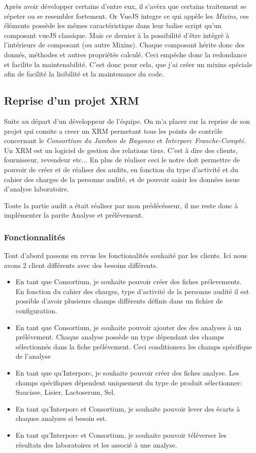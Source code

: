 Après avoir développer certains d'entre eux, il s'avèra que certains traitement se répeter ou se resembler fortement. Or VueJS integre ce qui appèle les \textit{Mixins}, ces éléments possède les mêmes caractéristique dans leur balise script qu'un composant vueJS classique. Mais ce dernier à la possibilité d'être intégré à l'intérieurs de composant (ou autre Mixins). Chaque composant hérite donc des donnés, méthodes et autres propriétés calculé. Ceci empêche donc la redondance et facilite la maintenabilité.
C'est donc pour cela, que j'ai créer un mixins spéciale afin de facilité la lisibilité et la maintenance du code. 


\subsection{Reprise d'un projet XRM}
Suite au départ d'un développeur de l'équipe. On m'a placer sur la reprise de son projet qui consite a creer un XRM permetant tous les points de contrôle concernant le \textit{Consortium du Jambon de Bayonne} et \textit{Interporc Franche-Compté}.
Un XRM est un logiciel de gestion des relations tiers. C'est à dire des clients, fournisseur, revendeur etc... En plus de réaliser ceci le notre doit permettre de pouvoir de créer et de réaliser des audits, en fonction du type d'activité et du cahier des charges de la personne audité, et de pouvoir saisir les données issue d'analyse laboratoire.

Toute la partie audit a était réaliser par mon prédécésseur, il me reste donc à implémenter la parite Analyse et prélévement. 

\subsubsection{Fonctionnalités}
Tout d'abord passons en revus les fonctionalités souhaité par les clients. Ici nous avons 2 client différents avec des besoins différents.
\begin{itemize}
    \item En tant que Consortium, je souhaite pouvoir créer des fiches prélevements. En fonction du cahier des charges, type d'activité de la personne audité il est possible d'avoir plusieurs champs différents définis dans un fichier de configuration.
    \item En tant que Consortium, je souhaite pouvoir ajouter des des analyses à un prélévement. Chaque analyse possède un type dépendant des champs sélectionnés dans la fiche prélévement. Ceci conditionera les champs spécifique de l'analyse
    \item En tant que qu'Interporc, je souhaite pouvoir créer des fiches analyse. Les champs spécifiques dépendent uniquement du type de produit sélectionner: Saucisse, Lisier, Lactoserum, Sel. 
    \item En tant qu'Interporc et Consortium, je souhaite pouvoir lever des écarts à chaques analyses si besoin est.  
    \item En tant qu'Interporc et Consortium, je souhaite pouvoir téléverser les résultats des laboratoires et les associé à une analyse. 
\end{itemize}



